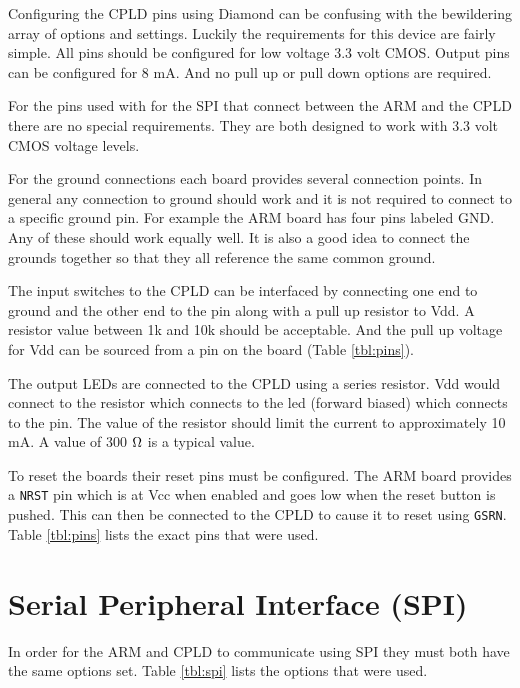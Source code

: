 \documentclass{article}
\begin{document}
Configuring the CPLD pins using Diamond\cite{Diamond} can
be confusing with the bewildering array of options and settings.
Luckily the requirements for this device are fairly simple.
All pins should be configured for low voltage 3.3 volt CMOS.
Output pins can be configured for 8 mA.
And no pull up or pull down options are required.

For the pins used with for the SPI that connect between the
ARM and the CPLD there are no special requirements.
They are both designed to work with 3.3 volt CMOS voltage levels.

For the ground connections each board provides several connection
points.
In general any connection to ground should work and
it is not required to connect to a specific ground pin.
For example the ARM board has four pins labeled GND.
Any of these should work equally well.
It is also a good idea to connect the grounds together so
that they all reference the same common ground.

The input switches to the CPLD can be interfaced by connecting
one end to ground and the other end to the pin along with a
pull up resistor to Vdd.
A resistor value between 1k and 10k should be acceptable.
And the pull up voltage for Vdd can be sourced from a pin on
the board (Table \ref{tbl:pins}).

The output LEDs are connected to the CPLD using a series
resistor.
Vdd would connect to the resistor which connects to the led
(forward biased) which connects to the pin.
The value of the resistor should limit the current to approximately
10 mA.
A value of 300 $\ohm$ is a typical value.

To reset the boards their reset pins must be configured.
The ARM board provides a \verb+NRST+ pin which is at Vcc
when enabled and goes low when the reset button is pushed\cite[Pg. 17, 20]{UM1079}.
This can then be connected to the CPLD to cause
it to reset using \verb+GSRN+\citetext{\citealp[Pg. 13, 46, 50, 53]{DS1002}; \citealp[Pg. 8]{EB66}}.
Table \ref{tbl:pins} lists the exact pins that were used.


\section{Serial Peripheral Interface (SPI)}

In order for the ARM and CPLD to communicate using SPI\citetext{ \citealp[Pg. 278]{cady2009microcontrollers}; \citealp[Pg. 665]{STRM0038}}
they must both have the same options set.
Table \ref{tbl:spi} lists the options that were used.
\end{document}
